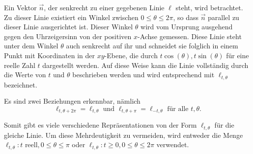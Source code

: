 Ein Vektor $\vec{n}$, der senkrecht zu einer gegebenen Linie $\ell$ steht, wird betrachtet. Zu dieser Linie existiert ein Winkel zwischen $0 \le \theta \le 2\pi$, so dass $\vec{n}$ parallel zu dieser Linie ausgerichtet ist. Dieser Winkel $\theta$ wird vom Ursprung ausgehend gegen den Uhrzeigersinn von der positiven $x$-Achse gemessen. Diese Linie steht unter dem Winkel $\theta$ auch senkrecht auf ihr und schneidet sie folglich in einem Punkt mit Koordinaten in der $xy$-Ebene, die durch $t\cos(\theta), t\sin(\theta)$ für eine reelle Zahl $t$ dargestellt werden. Auf diese Weise kann die Linie vollständig durch die Werte von $t$ und $\theta$ beschrieben werden und wird entsprechend mit $\ell_{t,\theta}$ bezeichnet.

Es sind zwei Beziehungen erkennbar, nämlich
\begin{equation}
	\ell_{t,\theta+2\pi} = \ell_{t,\theta} \text{ und } \ell_{t,\theta+\pi} = \ell_{-t,\theta} \text{ für alle } t, \theta.
\end{equation}

Somit gibt es viele verschiedene Repräsentationen von der Form $\ell_{t,\theta}$ für die gleiche Linie. Um diese Mehrdeutigkeit zu vermeiden, wird entweder die Menge ${\ell_{t,\theta} : t \text{ reell},  0 \le \theta \le \pi}$ oder ${\ell_{t,\theta} : t \ge 0,  0 \le \theta \le 2\pi}$ verwendet.


